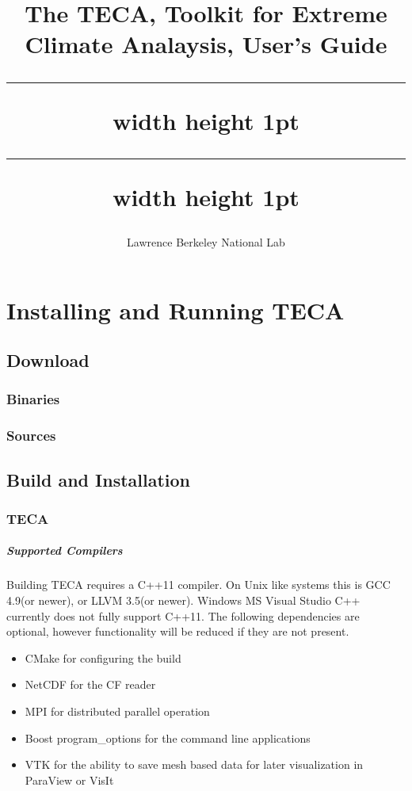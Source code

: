 \documentclass[a4paper,10pt,DIV=12]{scrreprt}
\title{%
The TECA, Toolkit for Extreme Climate Analaysis, User's Guide \\ \vspace{3mm} %
\hrule width \hsize height 1pt \vspace{0.51mm} %
\hrule width \hsize height 1pt}
\subtitle{Lawrence Berkeley National Lab}
\author{}
\begin{document}
\maketitle


\tableofcontents

\chapter{Installing and Running TECA}
\section{Download}
\subsection{Binaries}
\subsection{Sources}
\section{Build and Installation}
\subsection{TECA}
\paragraph{Supported Compilers}
Building TECA requires a C++11 compiler. On Unix like systems this is GCC
4.9(or newer), or LLVM 3.5(or newer). Windows MS Visual Studio C++ currently
does not fully support C++11. The following dependencies are optional, however functionality will be reduced if they are not present.

\begin{itemize}
\item CMake for configuring the build
\item NetCDF for the CF reader
\item MPI for distributed parallel operation
\item Boost program\_options for the command line applications
\item VTK for the ability to save mesh based data for later visualization in ParaView or VisIt
\end{itemize}
\end{document}
